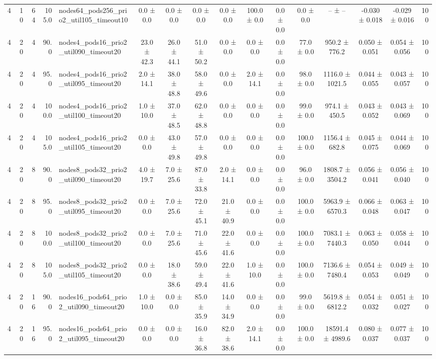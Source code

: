 \begin{tabular}{r r r r l c c c c c c c c c c r}
4 & 10 & 64 & 105.0 & nodes64\_pods256\_prio2\_util105\_timeout10 & 0.0 ± 0.0 & 0.0 ± 0.0 & 0.0 ± 0.0 & 0.0 ± 0.0 & 100.0 ± 0.0 & 0.0 ± 0.0 & 0.0 ± 0.0 & -- ± -- & -0.030 ± 0.018 & -0.029 ± 0.016 & 100 \\
4 & 20 & 4 & 90.0 & nodes4\_pods16\_prio2\_util090\_timeout20 & 23.0 ± 42.3 & 26.0 ± 44.1 & 51.0 ± 50.2 & 0.0 ± 0.0 & 0.0 ± 0.0 & 0.0 ± 0.0 & 77.0 ± 0.0 & 950.2 ± 776.2 & 0.050 ± 0.051 & 0.054 ± 0.056 & 100 \\
4 & 20 & 4 & 95.0 & nodes4\_pods16\_prio2\_util095\_timeout20 & 2.0 ± 14.1 & 38.0 ± 48.8 & 58.0 ± 49.6 & 0.0 ± 0.0 & 2.0 ± 14.1 & 0.0 ± 0.0 & 98.0 ± 0.0 & 1116.0 ± 1021.5 & 0.044 ± 0.055 & 0.043 ± 0.057 & 100 \\
4 & 20 & 4 & 100.0 & nodes4\_pods16\_prio2\_util100\_timeout20 & 1.0 ± 10.0 & 37.0 ± 48.5 & 62.0 ± 48.8 & 0.0 ± 0.0 & 0.0 ± 0.0 & 0.0 ± 0.0 & 99.0 ± 0.0 & 974.1 ± 450.5 & 0.043 ± 0.052 & 0.043 ± 0.069 & 100 \\
4 & 20 & 4 & 105.0 & nodes4\_pods16\_prio2\_util105\_timeout20 & 0.0 ± 0.0 & 43.0 ± 49.8 & 57.0 ± 49.8 & 0.0 ± 0.0 & 0.0 ± 0.0 & 0.0 ± 0.0 & 100.0 ± 0.0 & 1156.4 ± 682.8 & 0.045 ± 0.075 & 0.044 ± 0.069 & 100 \\
4 & 20 & 8 & 90.0 & nodes8\_pods32\_prio2\_util090\_timeout20 & 4.0 ± 19.7 & 7.0 ± 25.6 & 87.0 ± 33.8 & 2.0 ± 14.1 & 0.0 ± 0.0 & 0.0 ± 0.0 & 96.0 ± 0.0 & 1808.7 ± 3504.2 & 0.056 ± 0.041 & 0.056 ± 0.040 & 100 \\
4 & 20 & 8 & 95.0 & nodes8\_pods32\_prio2\_util095\_timeout20 & 0.0 ± 0.0 & 7.0 ± 25.6 & 72.0 ± 45.1 & 21.0 ± 40.9 & 0.0 ± 0.0 & 0.0 ± 0.0 & 100.0 ± 0.0 & 5963.9 ± 6570.3 & 0.066 ± 0.048 & 0.063 ± 0.047 & 100 \\
4 & 20 & 8 & 100.0 & nodes8\_pods32\_prio2\_util100\_timeout20 & 0.0 ± 0.0 & 7.0 ± 25.6 & 71.0 ± 45.6 & 22.0 ± 41.6 & 0.0 ± 0.0 & 0.0 ± 0.0 & 100.0 ± 0.0 & 7083.1 ± 7440.3 & 0.063 ± 0.050 & 0.058 ± 0.044 & 100 \\
4 & 20 & 8 & 105.0 & nodes8\_pods32\_prio2\_util105\_timeout20 & 0.0 ± 0.0 & 18.0 ± 38.6 & 59.0 ± 49.4 & 22.0 ± 41.6 & 1.0 ± 10.0 & 0.0 ± 0.0 & 100.0 ± 0.0 & 7136.6 ± 7480.4 & 0.054 ± 0.053 & 0.049 ± 0.049 & 100 \\
4 & 20 & 16 & 90.0 & nodes16\_pods64\_prio2\_util090\_timeout20 & 1.0 ± 10.0 & 0.0 ± 0.0 & 85.0 ± 35.9 & 14.0 ± 34.9 & 0.0 ± 0.0 & 0.0 ± 0.0 & 99.0 ± 0.0 & 5619.8 ± 6812.2 & 0.054 ± 0.032 & 0.051 ± 0.027 & 100 \\
4 & 20 & 16 & 95.0 & nodes16\_pods64\_prio2\_util095\_timeout20 & 0.0 ± 0.0 & 0.0 ± 0.0 & 16.0 ± 36.8 & 82.0 ± 38.6 & 2.0 ± 14.1 & 0.0 ± 0.0 & 100.0 ± 0.0 & 18591.4 ± 4989.6 & 0.080 ± 0.037 & 0.077 ± 0.037 & 100 \\

\end{tabular}
